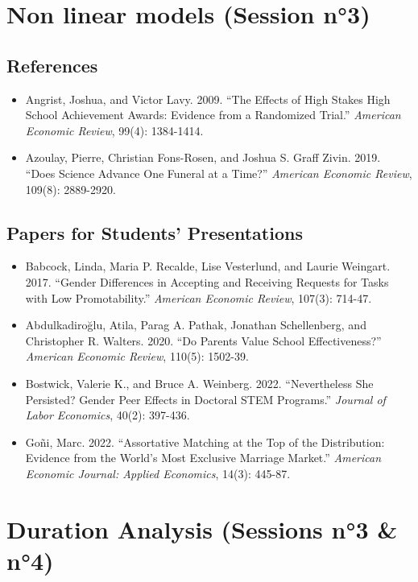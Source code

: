 \documentclass[a4paper,french,11pt]{article}
\begin{document}
\section{Non linear models (Session n°3)} 

\subsection{References}

\begin{itemize}
	\item Angrist, Joshua, and Victor Lavy. 2009. ``The Effects of High Stakes High School Achievement Awards: Evidence from a Randomized Trial.'' \textit{American Economic Review}, 99(4): 1384-1414.
	\item Azoulay, Pierre, Christian Fons-Rosen, and Joshua S. Graff Zivin. 2019. ``Does Science Advance One Funeral at a Time?'' \textit{American Economic Review}, 109(8): 2889-2920.
\end{itemize}

\subsection{Papers for Students' Presentations}

\begin{itemize}
	\item Babcock, Linda, Maria P. Recalde, Lise Vesterlund, and Laurie Weingart. 2017. ``Gender Differences in Accepting and Receiving Requests for Tasks with Low Promotability.'' \textit{American Economic Review}, 107(3): 714-47.
	\item Abdulkadiroğlu, Atila, Parag A. Pathak, Jonathan Schellenberg, and Christopher R. Walters. 2020. ``Do Parents Value School Effectiveness?'' \textit{American Economic Review}, 110(5): 1502-39.
	\item Bostwick, Valerie K., and Bruce A. Weinberg. 2022. ``Nevertheless She Persisted? Gender Peer Effects in Doctoral STEM Programs.'' \textit{Journal of Labor Economics}, 40(2): 397-436. 
	\item Goñi, Marc. 2022. ``Assortative Matching at the Top of the Distribution: Evidence from the World's Most Exclusive Marriage Market.'' \textit{American Economic Journal: Applied Economics}, 14(3): 445-87.
\end{itemize}

\section{Duration Analysis (Sessions n°3 \& n°4)}
\end{document}
